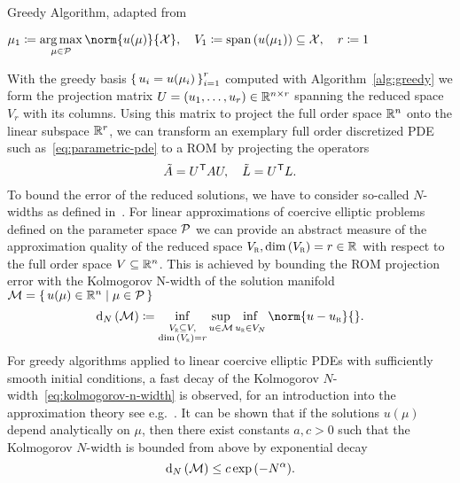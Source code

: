\begin{algorithm}\label{alg:greedy}
    \caption{Greedy Algorithm, adapted from~\cite[Algorithm~1]{Buffa2012}}
    $\mu_1 \coloneqq \argmax\limits_{\mu \in \mcl{P}} \norm{u(\mu)}{\mcl{X}},\quad V_1 \coloneqq \lspn{u(\mu_1)} \subseteq \mcl{X},\quad r \coloneqq 1$\;
\end{algorithm}

With the greedy basis ${\left\{\,u_i = u(\mu_i)\,\right\}}_{i = 1}^r$ computed with Algorithm~\ref{alg:greedy} we form the projection matrix $U = \left( u_1, \dots, u_r \right) \in \mathbb{R}^{n \times r}$ spanning the reduced space $V_r$ with its columns.
Using this matrix to project the full order space $\mathbb{R}^n$ onto the linear subspace $\mathbb{R}^r$, we can transform an exemplary full order discretized \ac{PDE} such as~\eqref{eq:parametric-pde} to a \ac{ROM} by projecting the operators
\begin{equation*}
    \tilde{A} = U^{\mkern1mu \mathsf{T}} A U,\quad \tilde{L} = U^{\mkern1mu \mathsf{T}} L.
\end{equation*}
To bound the error of the reduced solutions, we have to consider so-called $N$-widths as defined in~\cite{Pinkus1985}.
For linear approximations of coercive elliptic problems defined on the parameter space $\mathcal{P}$ we can provide an abstract measure of the approximation quality of the reduced space $V_{\textnormal{\scshape r}}, \dim{(V_{\textnormal{\scshape r}})} = r \in \mathbb{R}$ with respect to the full order space $V \subseteq \mathbb{R}^n$.
This is achieved by bounding the \ac{ROM} projection error with the Kolmogorov N-width of the solution manifold $\mathcal{M} = \left\{\,u(\mu) \in \mathbb{R}^n\mid\mu \in \mathcal{P}\,\right\}$
\begin{equation}\label{eq:kolmogorov-n-width}
    \kolm{\mcl{M}} \coloneqq \eqinf\limits_{\substack{V_\msc{r} \subseteq V,\\\dim{(V_\msc{r})} = r}} \sup\limits_{u \in \mcl{M}} \eqinf\limits_{u_\msc{r} \in V_N} \norm{u - u_\msc{r}}{}.
\end{equation}
For greedy algorithms applied to linear coercive elliptic \acp{PDE} with sufficiently smooth initial conditions, a fast decay of the Kolmogorov $N$-width~\eqref{eq:kolmogorov-n-width} is observed, for an introduction into the approximation theory see e.g.~\cite{Binev2011, DeVore2013}.
It can be shown that if the solutions $u(\mu)$ depend analytically on $\mu$, then there exist constants $a, c > 0$ such that the Kolmogorov $N$-width is bounded from above by exponential decay
\begin{equation*}
    \mathop{}\!\mathrm{d}_N\left(\mathcal{M}\right) \leq c \exp{(-N^\alpha)}.
\end{equation*}


